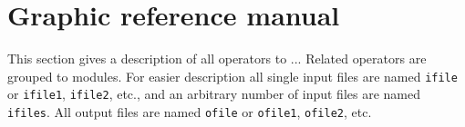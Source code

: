 \chapter{\label{refman}Graphic reference manual}

This section gives a description of all {\CDO} operators to ...
Related operators are grouped to modules.
For easier description all single input files are named {\tt ifile} or {\tt ifile1}, {\tt ifile2}, etc.,
and an arbitrary number of input files are named {\tt ifiles}.
All output files are named {\tt ofile} or {\tt ofile1}, {\tt ofile2}, etc.


\hspace{3mm}



